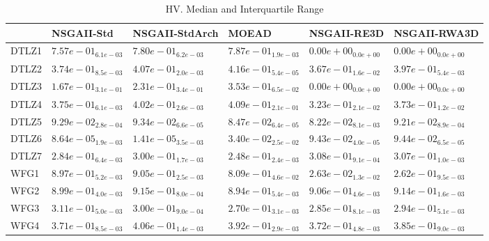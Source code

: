 \documentclass{article}
\begin{document}
\begin{table}
\caption{HV. Median and Interquartile Range}
\label{table: HV}
\centering
\begin{scriptsize}
\begin{tabular}{llllll}
\hline & NSGAII-Std & NSGAII-StdArch & MOEAD & NSGAII-RE3D &  NSGAII-RWA3D\\
\hline 
DTLZ1 & $  7.57e-01_{ 6.1e-03}$ & \cellcolor{gray25}$  7.80e-01_{ 6.2e-03}$ & \cellcolor{gray95}$  7.87e-01_{ 1.9e-03}$ & $  0.00e+00_{ 0.0e+00}$ & $  0.00e+00_{ 0.0e+00}$ \\
DTLZ2 & $  3.74e-01_{ 8.5e-03}$ & \cellcolor{gray25}$  4.07e-01_{ 2.0e-03}$ & \cellcolor{gray95}$  4.16e-01_{ 5.4e-05}$ & $  3.67e-01_{ 1.6e-02}$ & $  3.97e-01_{ 5.4e-03}$ \\
DTLZ3 & $  1.67e-01_{ 3.1e-01}$ & \cellcolor{gray25}$  2.31e-01_{ 3.4e-01}$ & \cellcolor{gray95}$  3.53e-01_{ 6.5e-02}$ & $  0.00e+00_{ 0.0e+00}$ & $  0.00e+00_{ 0.0e+00}$ \\
DTLZ4 & $  3.75e-01_{ 6.1e-03}$ & \cellcolor{gray25}$  4.02e-01_{ 2.6e-03}$ & \cellcolor{gray95}$  4.09e-01_{ 2.1e-01}$ & $  3.23e-01_{ 2.1e-02}$ & $  3.73e-01_{ 1.2e-02}$ \\
DTLZ5 & \cellcolor{gray25}$  9.29e-02_{ 2.8e-04}$ & \cellcolor{gray95}$  9.34e-02_{ 6.6e-05}$ & $  8.47e-02_{ 6.4e-05}$ & $  8.22e-02_{ 8.1e-03}$ & $  9.21e-02_{ 8.9e-04}$ \\
DTLZ6 & $  8.64e-05_{ 1.9e-03}$ & $  1.41e-05_{ 3.5e-03}$ & $  3.40e-02_{ 2.5e-02}$ & \cellcolor{gray25}$  9.43e-02_{ 4.0e-05}$ & \cellcolor{gray95}$  9.44e-02_{ 6.5e-05}$ \\
DTLZ7 & $  2.84e-01_{ 6.4e-03}$ & $  3.00e-01_{ 1.7e-03}$ & $  2.48e-01_{ 2.4e-03}$ & \cellcolor{gray95}$  3.08e-01_{ 9.1e-04}$ & \cellcolor{gray25}$  3.07e-01_{ 1.0e-03}$ \\
WFG1 & \cellcolor{gray25}$  8.97e-01_{ 5.2e-03}$ & \cellcolor{gray95}$  9.05e-01_{ 2.5e-03}$ & $  8.09e-01_{ 4.6e-02}$ & $  2.63e-02_{ 1.3e-02}$ & $  2.62e-01_{ 9.5e-03}$ \\
WFG2 & $  8.99e-01_{ 4.0e-03}$ & \cellcolor{gray95}$  9.15e-01_{ 8.0e-04}$ & $  8.94e-01_{ 5.4e-03}$ & $  9.06e-01_{ 4.6e-03}$ & \cellcolor{gray25}$  9.14e-01_{ 1.6e-03}$ \\
WFG3 & \cellcolor{gray95}$  3.11e-01_{ 5.0e-03}$ & \cellcolor{gray25}$  3.00e-01_{ 9.0e-04}$ & $  2.70e-01_{ 3.1e-03}$ & $  2.85e-01_{ 8.1e-03}$ & $  2.94e-01_{ 5.1e-03}$ \\
WFG4 & $  3.71e-01_{ 8.5e-03}$ & \cellcolor{gray95}$  4.06e-01_{ 1.4e-03}$ & \cellcolor{gray25}$  3.92e-01_{ 2.9e-03}$ & $  3.72e-01_{ 4.8e-03}$ & $  3.85e-01_{ 9.0e-03}$ \\

\end{tabular}
\end{scriptsize}
\end{table}
\end{document}
